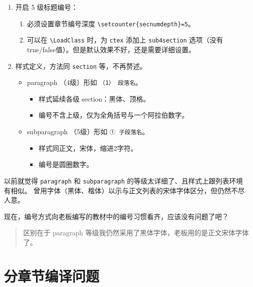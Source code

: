 \documentclass[../Main/thesis.tex]{subfiles}
\begin{document}
\begin{enumerate}
\def\labelenumi{\arabic{enumi}.}
\item
  开启 5 级标题编号：

  \begin{enumerate}
  \def\labelenumii{\arabic{enumii}.}
  \item
    必须设置章节编号深度
    \texttt{\textbackslash{}setcounter\{secnumdepth\}=5}。
  \item
    可以在 \texttt{\textbackslash{}LoadClass} 时，为 \texttt{ctex}
    添加上 \texttt{sub4section}
    选项（没有true/false值）。但是默认效果不好，还是需要详细设置。
  \end{enumerate}
\item
  样式定义，方法同 \texttt{section} 等，不再赘述。

  \begin{itemize}
  \item
    paragraph （4级）形如 \texttt{（1）\ 段落名}。

    \begin{itemize}
    \item
      样式延续各级 section：黑体、顶格。
    \item
      编号不含上级，仅为全角括号与一个阿拉伯数字。
    \end{itemize}
  \item
    subparagraph （5级）形如 \texttt{①\ 子段落名}。

    \begin{itemize}
    \item
      样式同正文，宋体，缩进2字符。
    \item
      编号是圆圈数字。
    \end{itemize}
  \end{itemize}
\end{enumerate}

以前就觉得 \texttt{paragraph} 和 \texttt{subparagraph}
的等级太详细了、且样式上跟列表环境有相似。
曾用字体（黑体、楷体）以示与正文列表的宋体字体区分，但仍然不尽人意。

现在，编号方式向老板编写的教材中的编号习惯看齐，应该没有问题了吧？

\begin{quote}
区别在于 paragraph 等级我仍然采用了黑体字体，老板用的是正文宋体字体了。
\end{quote}

\section{分章节编译问题}
\end{document}
